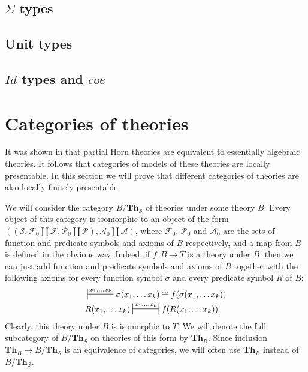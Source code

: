 \documentclass[reqno]{amsart}
\theoremstyle{definition}
\theoremstyle{remark}
\newcommand{\cat}[1]{\mathbf{#1}}
\newcommand{\Th}{\cat{Th}}
\numberwithin{figure}{section}
\begin{document}
\subsection{$\Sigma$ types}

\subsection{Unit types}

\subsection{$Id$ types and $coe$}

\section{Categories of theories}

It was shown in \cite{PHL} that partial Horn theories are equivalent to essentially algebraic theories.
It follows that categories of models of these theories are locally presentable.
In this section we will prove that different categories of theories are also locally finitely presentable.

We will consider the category $B/\Th_\mathcal{S}$ of theories under some theory $B$.
Every object of this category is isomorphic to an object of the form
$((\mathcal{S}, \mathcal{F}_0 \amalg \mathcal{F}, \mathcal{P}_0 \amalg \mathcal{P}), \mathcal{A}_0 \amalg \mathcal{A})$,
where $\mathcal{F}_0$, $\mathcal{P}_0$ and $\mathcal{A}_0$ are the sets of function and predicate symbols and axioms of $B$ respectively,
and a map from $B$ is defined in the obvious way.
Indeed, if $f : B \to T$ is a theory under $B$, then we can just add function and predicate symbols and axioms of $B$
together with the following axioms for every function symbol $\sigma$ and every predicate symbol $R$ of $B$:
\begin{align*}
& \sststile{}{x_1, \ldots x_k} \sigma(x_1, \ldots x_k) \cong f(\sigma(x_1, \ldots x_k)) \\
& R(x_1, \ldots x_k) \ssststile{}{x_1, \ldots x_k} f(R(x_1, \ldots x_k))
\end{align*}
Clearly, this theory under $B$ is isomorphic to $T$.
We will denote the full subcategory of $B/\Th_\mathcal{S}$ on theories of this form by $\Th_B$.
Since inclusion $\Th_B \to B/\Th_\mathcal{S}$ is an equivalence of categories, we will often use $\Th_B$ instead of $B/\Th_\mathcal{S}$.
\end{document}
